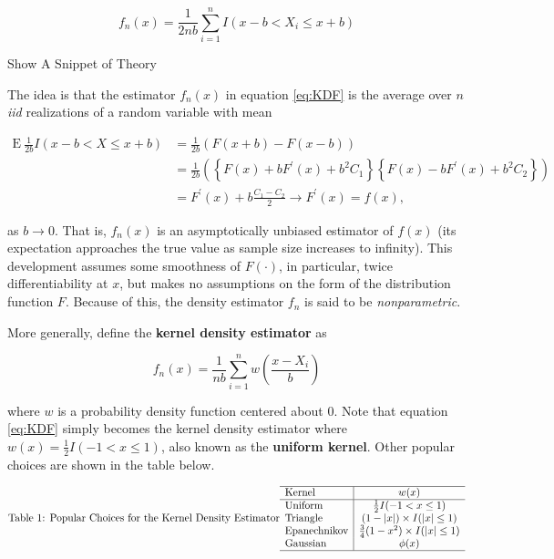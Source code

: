 \documentclass[]{book}
\theoremstyle{definition}
\theoremstyle{definition}
\theoremstyle{definition}
\theoremstyle{remark}
\begin{document}
\begin{equation} 
  f_n(x) = \frac{1}{2nb} \sum_{i=1}^n I(x-b < X_i \le x + b)
  \label{eq:KDF}
\end{equation}

Show A Snippet of Theory

\hypertarget{Theorykerneldensity}{}
The idea is that the estimator \(f_n(x)\) in equation \eqref{eq:KDF} is
the average over \(n\) \emph{iid} realizations of a random variable with
mean

\[\begin{aligned}
\mathrm{E~ } \frac{1}{2b} I(x-b < X \le x + b) &=  \frac{1}{2b}\left(F(x+b)-F(x-b)\right) \\
&=  \frac{1}{2b} \left( \left\{ F(x) + b F^{\prime}(x) + b^2 C_1\right\}
\left\{ F(x) - b F^{\prime}(x) + b^2 C_2\right\} \right) \\
&=  F^{\prime}(x) + b \frac{C_1-C_2}{2} \rightarrow  F^{\prime}(x) = f(x),
\end{aligned}\]

as \(b\rightarrow 0\). That is, \(f_n(x)\) is an asymptotically unbiased
estimator of \(f(x)\) (its expectation approaches the true value as
sample size increases to infinity). This development assumes some
smoothness of \(F(\cdot)\), in particular, twice differentiability at
\(x\), but makes no assumptions on the form of the distribution function
\(F\). Because of this, the density estimator \(f_n\) is said to be
\emph{nonparametric}.

More generally, define the \textbf{kernel density estimator} as

\begin{equation} 
  f_n(x) = \frac{1}{nb} \sum_{i=1}^n w\left(\frac{x-X_i}{b}\right)
  \label{eq:kernelDens}
\end{equation}

where \(w\) is a probability density function centered about 0. Note
that equation \eqref{eq:KDF} simply becomes the kernel density estimator
where \(w(x) = \frac{1}{2}I(-1 < x \le 1)\), also known as the
\textbf{uniform kernel}. Other popular choices are shown in the table
below.

\[\text{Table 1: Popular Choices for the Kernel Density Estimator} \\
\begin{array}{l|cc}
\hline
\text{Kernel} &  w(x) \\
\hline 
\text{Uniform } &  \frac{1}{2}I(-1 < x \le 1) \\
\text{Triangle} &  (1-|x|)\times I(|x| \le 1) \\
\text{Epanechnikov} & \frac{3}{4}(1-x^2) \times I(|x| \le 1) \\
\text{Gaussian} & \phi(x) \\
\hline
\end{array}\]
\end{document}
